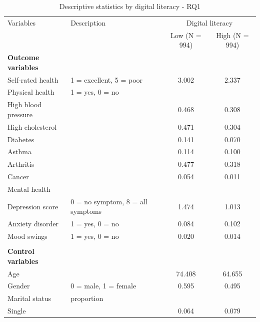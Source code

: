 \begin{table}
    \centering
    \footnotesize
    \caption{Descriptive statistics by digital literacy - RQ1}
    \label{tab:desc_stats_rq1}
    \begin{tabular}{llcc}
        \toprule
        Variables & Description & \multicolumn{2}{c}{Digital literacy} \\
        & & Low (N = 994) & High (N = 994) \\
        \midrule
        \textbf{Outcome variables} & & & \\
        Self-rated health & 1 = excellent, 5 = poor & 3.002 & 2.337 \\
        Physical health & 1 = yes, 0 = no & \\
        \hspace{0.5cm} High blood pressure &  & 0.468 & 0.308 \\
        \hspace{0.5cm} High cholesterol &  & 0.471 & 0.304 \\
        \hspace{0.5cm} Diabetes &  & 0.141 & 0.070 \\
        \hspace{0.5cm} Asthma &  & 0.114 & 0.100 \\
        \hspace{0.5cm} Arthritis &  & 0.477 & 0.318 \\
        \hspace{0.5cm} Cancer &  & 0.054 & 0.011 \\
        Mental health & & \\
        \hspace{0.5cm} Depression score & 0 = no symptom, 8 = all symptoms & 1.474 & 1.013 \\
        \hspace{0.5cm} Anxiety disorder & 1 = yes, 0 = no & 0.084 & 0.102 \\
        \hspace{0.5cm} Mood swings & 1 = yes, 0 = no & 0.020 & 0.014 \\
        & & & \\
        \textbf{Control variables} & & & \\
        Age &  & 74.408 & 64.655 \\
        Gender & 0 = male, 1 = female & 0.595 & 0.495 \\
        Marital status & proportion & & \\
        \hspace{0.5cm} Single &  & 0.064 & 0.079 \\

\end{tabular}
\end{table}
